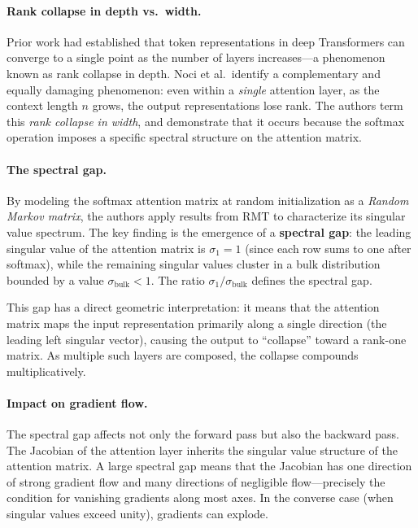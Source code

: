 \documentclass[12pt, a4paper]{article}
\begin{document}
\paragraph{Rank collapse in depth vs.\ width.}
Prior work had established that token representations in deep
Transformers can converge to a single point as the number of layers
increases---a phenomenon known as rank collapse in depth. Noci et al.\
identify a complementary and equally damaging phenomenon: even within a
\textit{single} attention layer, as the context length $n$ grows, the
output representations lose rank. The authors term this \textit{rank
collapse in width}, and demonstrate that it occurs because the softmax
operation imposes a specific spectral structure on the attention matrix.

\paragraph{The spectral gap.}
By modeling the softmax attention matrix at random initialization as a
\textit{Random Markov matrix}, the authors apply results from RMT to
characterize its singular value spectrum. The key finding is the
emergence of a \textbf{spectral gap}: the leading singular value of the
attention matrix is $\sigma_1 = 1$ (since each row sums to one after
softmax), while the remaining singular values cluster in a bulk
distribution bounded by a value $\sigma_\text{bulk} < 1$. The ratio
$\sigma_1 / \sigma_\text{bulk}$ defines the spectral gap.

This gap has a direct geometric interpretation: it means that the
attention matrix maps the input representation primarily along a single
direction (the leading left singular vector), causing the output to
``collapse'' toward a rank-one matrix. As multiple such layers are
composed, the collapse compounds multiplicatively.

\paragraph{Impact on gradient flow.}
The spectral gap affects not only the forward pass but also the backward
pass. The Jacobian of the attention layer inherits the singular value
structure of the attention matrix. A large spectral gap means that the
Jacobian has one direction of strong gradient flow and many directions
of negligible flow---precisely the condition for vanishing gradients
along most axes. In the converse case (when singular values exceed
unity), gradients can explode.
\end{document}
